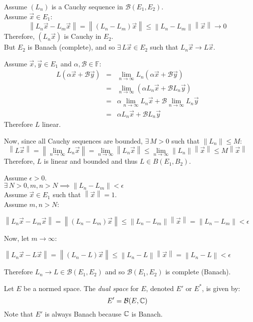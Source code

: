 \documentclass[letterpaper,12pt,fleqn]{article}
\newcommand{\vx}{\vec{x}}
\newcommand{\vy}{\vec{y}}
\newcommand{\norm}[1]{\left\|#1\right\|}
\renewcommand{\a}{\alpha}
\renewcommand{\b}{\beta}
\newcommand{\e}{\epsilon}
\renewcommand{\b}{\mathcal{B}}
\newcommand{\F}{\mathbb{F}}
\begin{document}
\begin{theproof}
  Assume $(L_n)$ is a Cauchy sequence in $\b(E_1,E_2)$. \\
  Assume $\vx\in E_1$:
  \[\norm{L_n\vx-L_m\vx}=\norm{(L_n-L_m)\vx}\le\norm{L_n-L_m}\norm{\vx}\to0\]
  Therefore, $(L_n\vx)$ is Cauchy in $E_2$. \\
  But $E_2$ is Banach (complete), and so $\exists\,L\vx\in E_2$ such that
  $L_n\vx\to L\vx$.

  Assume $\vx,\vy\in E_1$ and $\a,\b\in\F$:
  \begin{eqnarray*}
    L(\a\vx+\b\vy) &=& \lim_{n\to\infty}L_n(\a\vx+\b\vy) \\
    &=& \lim_{n\to\infty}(\a L_n\vx+\b L_n\vy) \\
    &=& \a\lim_{n\to\infty}L_n\vx+\b\lim_{n\to\infty}L_n\vy \\
    &=& \a L_n\vx+\b L_n\vy
  \end{eqnarray*}
  Therefore $L$ linear.

  Now, since all Cauchy sequences are bounded, $\exists\,M>0$ such that
  $\norm{L_n}\le M$:
  \[\norm{L\vx}=\norm{\lim_{n\to\infty}L_n\vx}=\lim_{n\to\infty}\norm{L_n\vx}
  \le\lim_{n\to\infty}\norm{L_n}\norm{\vx}\le M\norm{\vx}\]
  Therefore, $L$ is linear and bounded and thus $L\in B(E_1,B_2)$.

  Assume $\e>0$. \\
  $\exists\,N>0,m,n>N\implies\norm{L_n-L_m}<\e$ \\
  Assume $\vx\in E_1$ such that $\norm{\vx}=1$. \\
  Assume $m,n>N$:

  $\norm{L_n\vx-L_m\vx}=\norm{(L_n-L_m)\vx}\le\norm{L_n-L_m}\norm{\vx}=
  \norm{L_n-L_m}<\e$
  
  Now, let $m\to\infty$:
  
  $\norm{L_n\vx-L\vx}=\norm{(L_n-L)\vx}\le\norm{L_n-L}\norm{\vx}=
  \norm{L_n-L}<\e$

  Therefore $L_n\to L\in\b(E_1,E_2)$ and so $\b(E_1,E_2)$ is complete (Banach).
\end{theproof}

\begin{definition}
  Let $E$ be a normed space. The \emph{dual space} for $E$, denoted $E'$ or
  $E^*$, is given by:
  \[E'=\b(E,\C)\]
  Note that $E'$ is always Banach because $\mathbb{C}$ is Banach.
\end{definition}
\end{document}
